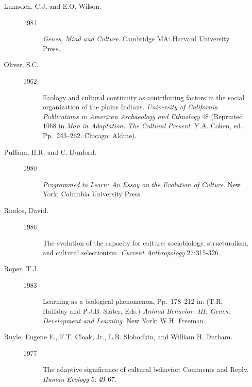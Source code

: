 \documentclass[11pt]{article}
\begin{document}
\begin{description}
\item[Lumsden, C.J. and E.O. Wilson.]
\mbox{}\begin{description}
\item[1981] \emph{Genes, Mind and Culture}.
Cambridge MA: Harvard University Press. 
\end{description}

\item[Oliver, S.C.]
\mbox{}\begin{description}
\item[1962] Ecology and cultural continuity as contributing
factors in the social organization of the plains Indians.  \emph{University
of California Publications in American Archaeology and Ethnology} 48
(Reprinted 1968 in \emph{Man in Adaptation: The Cultural Present}.  Y.A.
Cohen, ed. Pp.~243--262. Chicago: Aldine).  
\end{description}

\item[Pulliam, H.R. and C. Dunford.]
\mbox{}\begin{description}
\item[1980] \emph{Programmed to Learn: An
Essay on the Evolution of Culture}. New York: Columbia University Press.  
\end{description}

\item[Rindos, David.]
\mbox{}\begin{description}
\item[1986] The evolution of the capacity for culture:
sociobiology, structuralism, and cultural selectionism. \emph{Current
Anthropology} 27:315-326.
\end{description}

\item[Roper, T.J.]
\mbox{}\begin{description}
\item[1983] Learning as a biological phenomenon, Pp.~178--212
in: (T.R. Halliday and P.J.B. Slater, Eds.) \emph{Animal Behavior. III.
Genes, Development and Learning}.  New York: W.H. Freeman.  
\end{description}

\item[Ruyle, Eugene E., F.T. Cloak, Jr., L.B. Slobodkin, and William H.
Durham.]
\mbox{}\begin{description}
\item[1977] The adaptive significance of cultural behavior: Comments and
Reply. \emph{Human Ecology} 5: 49-67.
\end{description}


\end{description}
\end{document}
